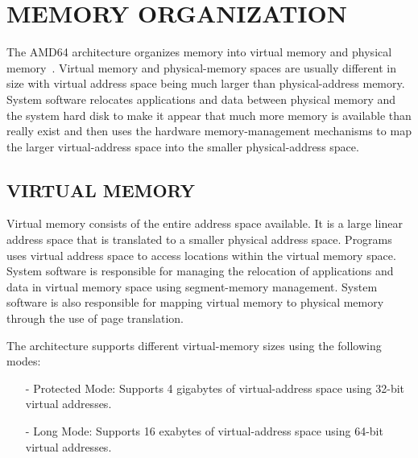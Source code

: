 \section{MEMORY ORGANIZATION}

The AMD64 architecture organizes memory into virtual memory and physical memory~\citep{SS:AMD64-V2}. Virtual memory and physical-memory spaces are usually different in size with virtual address space being much larger than physical-address memory.  System software relocates applications and data between physical memory and the system hard disk to make it appear that much more memory is available than really exist and then uses the hardware memory-management mechanisms to map the larger virtual-address space into the smaller physical-address space.

\subsection {VIRTUAL MEMORY}
Virtual memory consists of the entire address space available. It is a large linear address space that is translated to a smaller physical address space. Programs uses virtual address space to access locations within the virtual memory space. System software is responsible for managing the relocation of applications and data in virtual memory space using segment-memory management. System software is also responsible for mapping virtual memory to physical memory through the use of page translation.

The architecture supports different virtual-memory sizes using the following modes:
\begin{itemize}

\item[-] Protected Mode: Supports 4 gigabytes of virtual-address space using 32-bit virtual  addresses.

\item[-] Long Mode: Supports 16 exabytes of virtual-address space using 64-bit virtual addresses.
\end{itemize}

